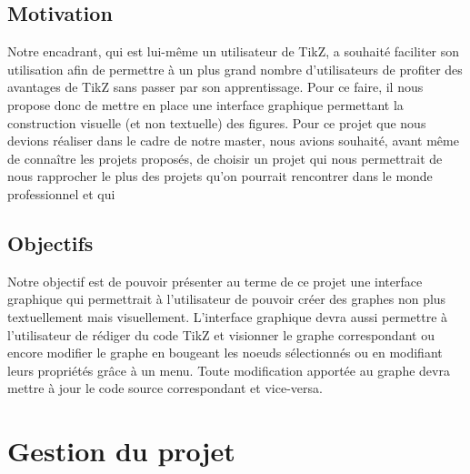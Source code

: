 \documentclass[a4paper]{report}
\begin{document}
  \subsection{Motivation}
  Notre encadrant, qui est lui-même un utilisateur de TikZ, a souhaité faciliter son utilisation afin de permettre à un plus grand nombre d'utilisateurs de profiter des avantages de TikZ sans passer par son apprentissage. Pour ce faire, il nous propose donc de mettre en place une interface graphique permettant la construction  visuelle (et non textuelle) des figures.
  \newline
  Pour ce projet que nous devions réaliser dans le cadre de notre master, nous avions souhaité, avant même de 
connaître les projets proposés, de choisir un projet qui nous permettrait de nous rapprocher le plus des projets qu'on pourrait rencontrer dans le monde professionnel et qui 
  \subsection{Objectifs}
Notre objectif est de pouvoir présenter au terme de ce projet une interface graphique qui permettrait à l'utilisateur de pouvoir créer des graphes non plus textuellement mais visuellement. L'interface graphique devra aussi permettre à l'utilisateur de rédiger du code TikZ et visionner le graphe correspondant ou encore modifier le graphe en bougeant les noeuds sélectionnés ou en modifiant leurs propriétés grâce à un menu.
Toute modification apportée au graphe devra mettre à jour le code source correspondant et vice-versa. 
  \section {Gestion du projet}
\end{document}

